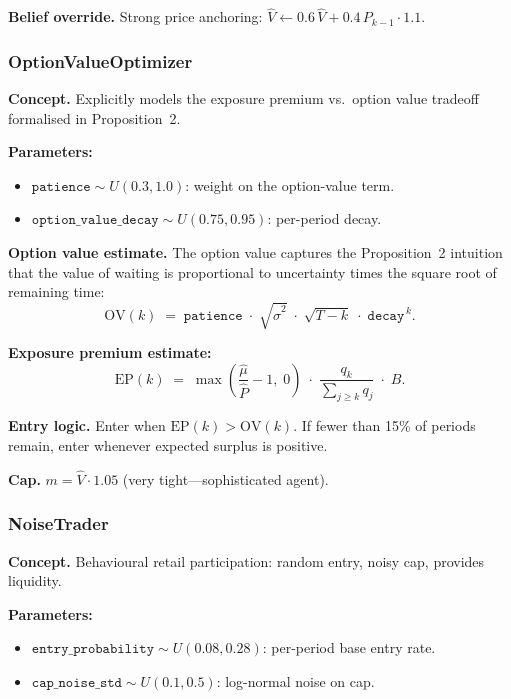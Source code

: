 \documentclass[11pt,a4paper]{article}
\begin{document}
\textbf{Belief override.}  Strong price anchoring: $\hat{V} \leftarrow 0.6\,\hat{V} + 0.4\,P_{k-1}\cdot 1.1$.


\subsubsection{OptionValueOptimizer}
\label{sec:option-value}

\textbf{Concept.}  Explicitly models the exposure premium vs.\ option value tradeoff formalised in Proposition~2.

\textbf{Parameters:}
\begin{itemize}[nosep]
  \item $\texttt{patience} \sim U(0.3,1.0)$: weight on the option-value term.
  \item $\texttt{option\_value\_decay} \sim U(0.75,0.95)$: per-period decay.
\end{itemize}

\textbf{Option value estimate.}  The option value captures the Proposition~2 intuition that the value of waiting is proportional to uncertainty times the square root of remaining time:
\begin{equation}\label{eq:option-value}
  \mathrm{OV}(k) \;=\; \texttt{patience}\;\cdot\;\sqrt{\hat{\sigma}^2}\;\cdot\;\sqrt{T - k}\;\cdot\;\texttt{decay}^{\,k}.
\end{equation}

\textbf{Exposure premium estimate:}
\begin{equation}\label{eq:exposure-premium}
  \mathrm{EP}(k) \;=\; \max\!\left(\frac{\hat{\mu}}{\hat{P}} - 1,\;0\right)\;\cdot\;\frac{q_k}{\sum_{j \geq k} q_j}\;\cdot\; B.
\end{equation}

\textbf{Entry logic.}  Enter when $\mathrm{EP}(k) > \mathrm{OV}(k)$.  If fewer than 15\% of periods remain, enter whenever expected surplus is positive.

\textbf{Cap.}  $m = \hat{V} \cdot 1.05$ (very tight—sophisticated agent).


\subsubsection{NoiseTrader}
\label{sec:noise-trader}

\textbf{Concept.}  Behavioural retail participation: random entry, noisy cap, provides liquidity.

\textbf{Parameters:}
\begin{itemize}[nosep]
  \item $\texttt{entry\_probability} \sim U(0.08,0.28)$: per-period base entry rate.
  \item $\texttt{cap\_noise\_std} \sim U(0.1,0.5)$: log-normal noise on cap.
\end{itemize}
\end{document}
